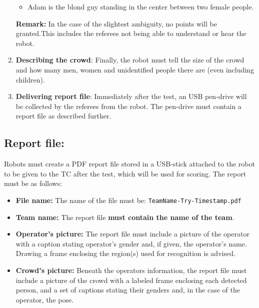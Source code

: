 \begin{enumerate}
\begin{itemize}
    \item Adam is the blond guy standing in the center between two female people.
  \end{itemize}

  \textbf{Remark:} In the case of the slightest ambiguity, no points will be granted.This includes the referees not being able to understand or hear the robot.

  \item \textbf{Describing the crowd}: Finally, the robot must tell the size of the crowd and how many men, women and unidentified people there are (even including children).

  \item \textbf{Delivering report file}: Immediately after the test, an USB pen-drive will be collected by the referees from the robot. The pen-drive must contain a report file as described further.
\end{enumerate}

\subsection{Report file:}
Robots must create a PDF report file stored in a USB-stick attached to the robot to be given to the TC after the test, which will be used for scoring. The report must be as follows:
\begin{itemize}

  \item \textbf{File name:} The name of the file must be: \texttt{TeamName-Try-Timestamp.pdf}

  \item \textbf{Team name:} The report file \textbf{must contain the name of the team}.

  \item \textbf{Operator's picture:} The report file must include a picture of the operator with a caption stating operator's gender and, if given, the operator's name. Drawing a frame enclosing the region(s) used for recognition is advised.

  \item \textbf{Crowd's picture:} Beneath the operators information, the report file must include a picture of the crowd with a labeled frame enclosing each detected person, and a set of captions stating their genders and, in the case of the operator, the pose. 
\end{itemize}

